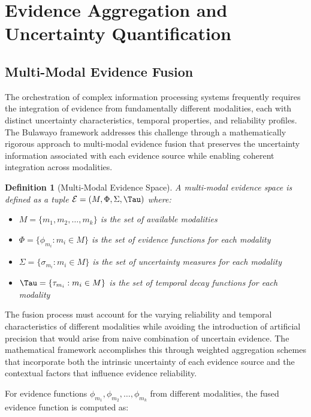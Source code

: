 \documentclass[12pt,a4paper]{article}
\newtheorem{definition}[theorem]{Definition}
\begin{document}
\section{Evidence Aggregation and Uncertainty Quantification}

\subsection{Multi-Modal Evidence Fusion}

The orchestration of complex information processing systems frequently requires the integration of evidence from fundamentally different modalities, each with distinct uncertainty characteristics, temporal properties, and reliability profiles. The Bulawayo framework addresses this challenge through a mathematically rigorous approach to multi-modal evidence fusion that preserves the uncertainty information associated with each evidence source while enabling coherent integration across modalities.

\begin{definition}[Multi-Modal Evidence Space]
A multi-modal evidence space is defined as a tuple $\mathcal{E} = (M, \Phi, \Sigma, \Tau)$ where:
\begin{itemize}
\item $M = \{m_1, m_2, \ldots, m_k\}$ is the set of available modalities
\item $\Phi = \{\phi_{m_i} : m_i \in M\}$ is the set of evidence functions for each modality
\item $\Sigma = \{\sigma_{m_i} : m_i \in M\}$ is the set of uncertainty measures for each modality
\item $\Tau = \{\tau_{m_i} : m_i \in M\}$ is the set of temporal decay functions for each modality
\end{itemize}
\end{definition}

The fusion process must account for the varying reliability and temporal characteristics of different modalities while avoiding the introduction of artificial precision that would arise from naive combination of uncertain evidence. The mathematical framework accomplishes this through weighted aggregation schemes that incorporate both the intrinsic uncertainty of each evidence source and the contextual factors that influence evidence reliability.

For evidence functions $\phi_{m_1}, \phi_{m_2}, \ldots, \phi_{m_k}$ from different modalities, the fused evidence function is computed as:
\end{document}
